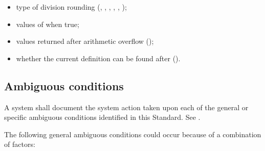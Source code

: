 \begin{itemize}
\item type of division rounding (,
	, , ,
	, );

\item values of  when true;

\item values returned after arithmetic overflow
	();

\item whether the current definition can be found after
	 ().

\end{itemize}



\subsection{Ambiguous conditions} %
\label{doc:ambiguous}

A system shall document the system action taken upon each of the
general or specific ambiguous conditions identified in this
Standard. See .

The following general ambiguous conditions could occur because of a
combination of factors:

